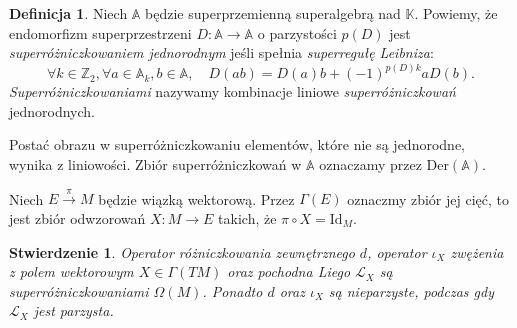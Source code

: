 \documentclass[11pt,a4paper]{report}
\newtheorem{proposition}[theorem]{Stwierdzenie}
\theoremstyle{definition}
\newtheorem{definition}[theorem]{Definicja}
\begin{document}
\begin{definition}
	Niech $\mathbb{A}$ będzie superprzemienną superalgebrą nad $\mathbb{K}$. Powiemy, że endomorfizm superprzestrzeni $D: \mathbb{A} \rightarrow \mathbb{A}$ o parzystości $p(D)$ jest \textit{superróżniczkowaniem jednorodnym}  jeśli spełnia \textit{superregułę Leibniza}:
	\begin{equation*}
		\forall k \in \mathbb{Z}_2, \forall a \in \mathbb{A}_k, b \in \mathbb{A}, \quad D(ab) = D(a)b + (-1)^{p(D)k}aD(b).
	\end{equation*}
	\textit{Superróżniczkowaniami} nazywamy kombinacje liniowe \textit{superróżniczkowa\'n} jednorodnych.
\end{definition}

Postać obrazu w superróżniczkowaniu elementów, które nie są jednorodne, wynika z liniowości. Zbiór superróżniczkowań w $\mathbb{A}$ oznaczamy przez $\mathrm{Der}(\mathbb{A})$.

Niech $E \stackrel{\pi}{\longrightarrow} M$ będzie wiązką wektorową. Przez $\Gamma(E)$ oznaczmy zbiór jej cięć, to jest zbiór odwzorowań $X: M \rightarrow E$ takich, że $\pi \circ X = \mathrm{Id}_M.$

\begin{proposition} 
	Operator różniczkowania zewnętrznego $d$, operator $\iota_X$ zwężenia z polem wektorowym $X \in \Gamma(TM)$ oraz pochodna Liego $\mathcal{L}_X$ są superróżniczkowaniami $\Omega(M)$. Ponadto $d$ oraz $\iota_X$ są nieparzyste, podczas gdy $\mathcal{L}_X$ jest parzysta. 
\end{proposition}
\end{document}
